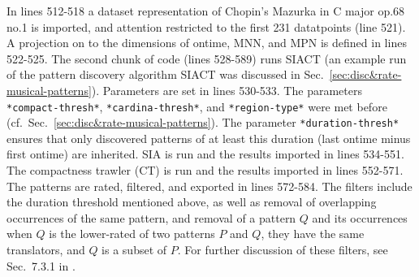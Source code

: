 In lines 512-518 a dataset representation of Chopin's Mazurka in C major op.68 no.1 is imported, and attention restricted to the first 231 datatpoints (line 521). A projection on to the dimensions of ontime, MNN, and MPN is defined in lines 522-525. The second chunk of code (lines 528-589) runs SIACT (an example run of the pattern discovery algorithm SIACT was discussed in Sec.~\ref{sec:disc&rate-musical-patterns}). Parameters are set in lines 530-533. The parameters \texttt{*compact-thresh*}, \texttt{*cardina-thresh*}, and \texttt{*region-type*} were met before (cf.~Sec.~\ref{sec:disc&rate-musical-patterns}). The parameter \texttt{*duration-thresh*} ensures that only discovered patterns of at least this duration (last ontime minus first ontime) are inherited. SIA is run and the results imported in lines 534-551. The compactness trawler (CT) is run and the results imported in lines 552-571. The patterns are rated, filtered, and exported in lines 572-584. The filters include the duration threshold mentioned above, as well as removal of overlapping occurrences of the same pattern, and removal of a pattern $Q$ and its occurrences when $Q$ is the lower-rated of two patterns $P$ and $Q$, they have the same translators, and $Q$ is a subset of $P$. For further discussion of these filters, see Sec.~7.3.1 in \citet{collins2011b}.

